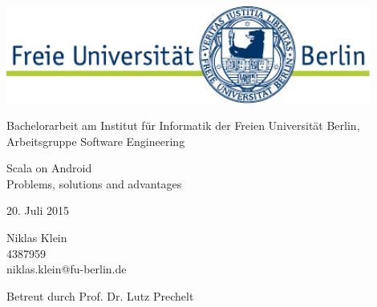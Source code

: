 \begin{titlepage}
\begin{center}

	\includegraphics[width=12cm]{asset/fu-logo.pdf}

	\vspace{1.5cm}

	Bachelorarbeit am Institut für Informatik der Freien Universität Berlin, Arbeitsgruppe Software Engineering

	\vspace{2.5cm}

	\begin{spacing}{1.3}
	\begin{huge}

		Scala on Android\\
		Problems, solutions and advantages

	\end{huge}
	\end{spacing}

	\vspace{1.2cm}

	20. Juli 2015

	\vspace{\fill}

	Niklas Klein\\
	4387959\\
	niklas.klein@fu-berlin.de

	\vspace{0.7cm}

	Betreut durch Prof. Dr. Lutz Prechelt

\end{center}
\end{titlepage}